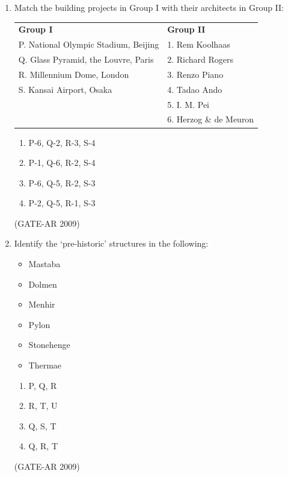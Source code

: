 \documentclass[a4paper,10pt]{article}
\begin{document}
\begin{enumerate}
    \item Match the building projects in Group I with their architects in Group II:  \\
    \begin{tabular}{ l l }
	\textbf{Group I} & \textbf{Group II} \\
	P. National Olympic Stadium, Beijing & 1. Rem Koolhaas \\
	Q. Glass Pyramid, the Louvre, Paris & 2. Richard Rogers \\
	R. Millennium Dome, London & 3. Renzo Piano \\
	S. Kansai Airport, Osaka & 4. Tadao Ando \\
	& 5. I. M. Pei \\
	& 6. Herzog \& de Meuron \\
	\end{tabular}
	\begin{multicols}{2}
	\begin{enumerate}
        \item P-6, Q-2, R-3, S-4
        \item P-1, Q-6, R-2, S-4
        \item P-6, Q-5, R-2, S-3
        \item P-2, Q-5, R-1, S-3
    \end{enumerate}
	\end{multicols}
    \hfill (GATE-AR 2009)

    \item Identify the ‘pre-historic’ structures in the following: 
    \begin{itemize}
        \item Mastaba
        \item Dolmen
        \item Menhir
        \item Pylon
        \item Stonehenge
        \item Thermae
    \end{itemize}
    \begin{multicols}{4}
	\begin{enumerate}
        \item P, Q, R
        \item R, T, U
        \item Q, S, T
        \item Q, R, T
    \end{enumerate}
	\end{multicols}
    \hfill (GATE-AR 2009)


\end{enumerate}
\end{document}
